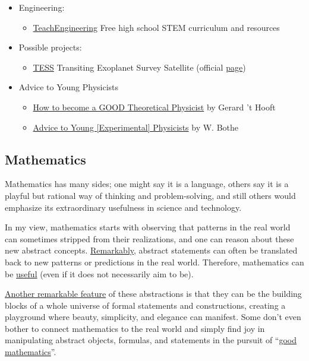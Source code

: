 \documentclass{article}
\begin{document}
\begin{itemize}
\item Engineering:
\begin{itemize}
    \item \href{https://www.teachengineering.org/}{TeachEngineering} Free high school STEM curriculum and resources
\end{itemize}

\item Possible projects:
\begin{itemize}
    \item \href{https://archive.stsci.edu/missions-and-data/tess}{TESS} Transiting Exoplanet Survey Satellite (official \href{https://tess.mit.edu/}{page}) 
\end{itemize}

\item Advice to Young Physicists
\begin{itemize}
    \item \href{https://www.goodtheorist.science/}{How to become a GOOD Theoretical Physicist} by Gerard 't Hooft
    \item \href{https://imechanica.org/files/Advice%20to%20Young%20Physicists_0.pdf}{Advice to Young [Experimental] Physicists} by W. Bothe
\end{itemize}

\end{itemize}

\subsection{Mathematics}

Mathematics has many sides; one might say it is a language, others say it is a playful but rational way of thinking and problem-solving, and still others would emphasize its extraordinary usefulness in science and technology.

In my view, mathematics starts with observing that patterns in the real world can sometimes stripped from their realizations, and one can reason about these new abstract concepts. \href{https://www.maths.ed.ac.uk/~v1ranick/papers/wigner.pdf}{Remarkably}, abstract statements can often be translated back to new patterns or predictions in the real world. Therefore, mathematics can be \href{https://www.youtube.com/watch?v=BQHbdi8A0p8}{useful} (even if it does not necessarily aim to be).

\href{https://archive.org/details/hardy_annotated}{Another remarkable feature} of these abstractions is that they can be the building blocks of a whole universe of formal statements and constructions, creating a playground where beauty, simplicity, and elegance can manifest.
Some don't even bother to connect mathematics to the real world and simply find joy in manipulating abstract objects, formulas, and statements in the pursuit of ``\href{https://arxiv.org/pdf/math/0702396}{good mathematics}''.
\end{document}

